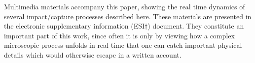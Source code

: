 Multimedia materials accompany this paper, 
showing the real time dynamics of several impact/capture processes 
described here. These materials  are presented 
in the electronic supplementary information (ESI$\dag$) document.
They constitute  an important part of this work, 
since often it is only by viewing how a complex microscopic process
unfolds in real time that one can catch important physical details 
which would otherwise escape in a written account. 

%
% 
%
%
%
